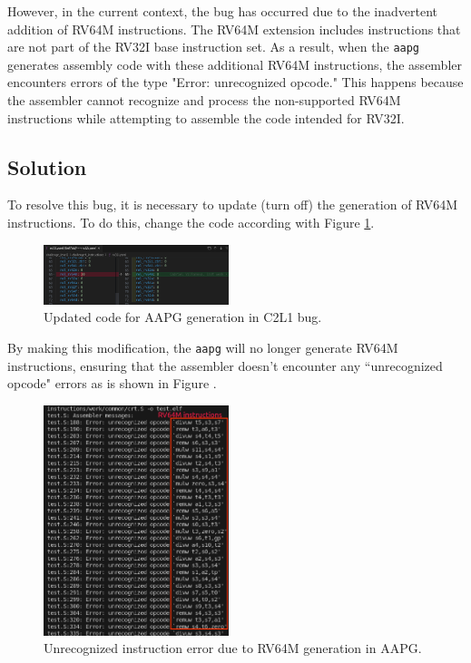 However, in the current context, the bug has occurred due to the inadvertent addition of RV64M instructions. The RV64M extension includes instructions that are not part of the RV32I base instruction set. As a result, when the \texttt{aapg} generates assembly code with these additional RV64M instructions, the assembler encounters errors of the type "Error: unrecognized opcode." This happens because the assembler cannot recognize and process the non-supported RV64M instructions while attempting to assemble the code intended for RV32I.

\subsection{Solution}

To resolve this bug, it is necessary to update (turn off) the generation of RV64M instructions. To do this, change the code according with Figure \ref{fig:rv32i_diff}. 


\begin{figure}[H]
    \centering
    \includegraphics[width=0.48\textwidth]{./rv32i_diff.png}
    \caption{Updated code for AAPG generation in C2L1 bug.}
    \label{fig:rv32i_diff}
\end{figure}


By making this modification, the \texttt{aapg} will no longer generate RV64M instructions, ensuring that the assembler doesn't encounter any ``unrecognized opcode" errors as is shown in Figure \label{ref:unrec}.

\begin{figure}[H]
    \centering
    \includegraphics[width=0.48\textwidth]{./unrec_op.png}
    \caption{Unrecognized instruction error due to RV64M generation in AAPG.}
    \label{fig:unrec}
\end{figure}
